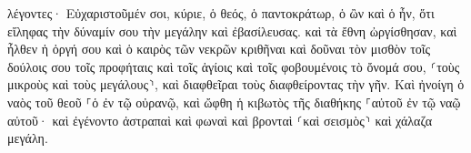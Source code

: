\documentclass{openreader}
\begin{document}
λέγοντες· Εὐχαριστοῦμέν σοι, κύριε, ὁ θεός, ὁ παντοκράτωρ, ὁ ὢν καὶ ὁ ἦν, ὅτι εἴληφας τὴν δύναμίν σου τὴν μεγάλην καὶ ἐβασίλευσας. 
καὶ τὰ ἔθνη ὠργίσθησαν, καὶ ἦλθεν ἡ ὀργή σου καὶ ὁ καιρὸς τῶν νεκρῶν κριθῆναι καὶ δοῦναι τὸν μισθὸν τοῖς δούλοις σου τοῖς προφήταις καὶ τοῖς ἁγίοις καὶ τοῖς φοβουμένοις τὸ ὄνομά σου, ⸂τοὺς μικροὺς καὶ τοὺς μεγάλους⸃, καὶ διαφθεῖραι τοὺς διαφθείροντας τὴν γῆν. 
Καὶ ἠνοίγη ὁ ναὸς τοῦ θεοῦ ⸀ὁ ἐν τῷ οὐρανῷ, καὶ ὤφθη ἡ κιβωτὸς τῆς διαθήκης ⸀αὐτοῦ ἐν τῷ ναῷ αὐτοῦ· καὶ ἐγένοντο ἀστραπαὶ καὶ φωναὶ καὶ βρονταὶ ⸂καὶ σεισμὸς⸃ καὶ χάλαζα μεγάλη. 
\end{document}
